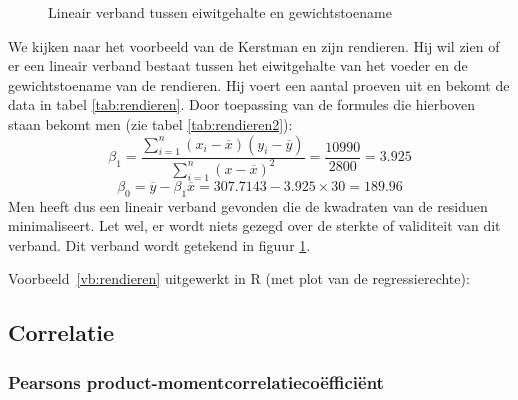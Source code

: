 \begin{figure}

  \caption{Lineair verband tussen eiwitgehalte en gewichtstoename}
  \label{fig:rendierenFiguur}
\end{figure}

\begin{example}
  \label{vb:rendieren}
  We kijken naar het voorbeeld van de Kerstman en zijn rendieren. Hij wil zien of er een lineair verband bestaat tussen het eiwitgehalte van het voeder en de gewichtstoename van de rendieren. Hij voert een aantal proeven uit en bekomt de data in tabel \ref{tab:rendieren}. Door toepassing van de formules die hierboven staan bekomt men (zie tabel \ref{tab:rendieren2}):
  \[ \beta_{1} = \frac{\sum_{i=1}^{n} (x_{i}-\overline{x})(y_{i} - \overline{y})}{\sum_{i=1}^{n} (x-\overline{x})^{2}} = \frac{10990}{2800} = 3.925 \]
  \[ \beta_{0} = \overline{y} - \beta_{1} \overline{x} = 307.7143 - 3.925 \times 30 = 189.96 \]
  Men heeft dus een lineair verband gevonden die de kwadraten van de residuen minimaliseert. Let wel, er wordt niets gezegd over de sterkte of validiteit van dit verband. Dit verband wordt getekend in figuur \ref{fig:rendierenFiguur}.
\end{example}

Voorbeeld~\ref{vb:rendieren} uitgewerkt in R (met plot van de regressierechte):



\subsection{Correlatie}
\label{sec:correlatie}

\subsubsection{Pearsons product-momentcorrelatiecoëfficiënt}

